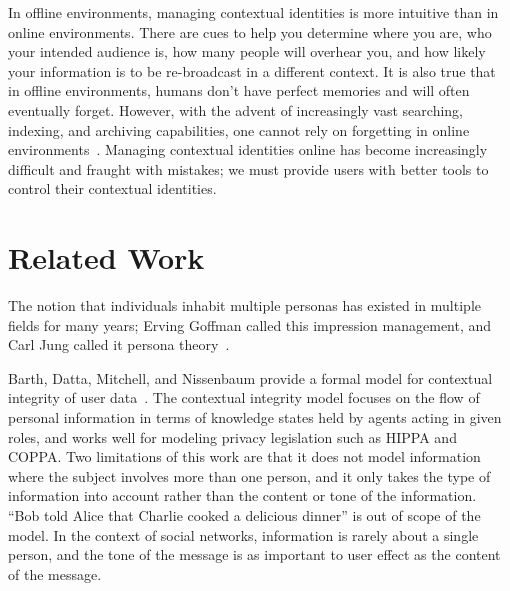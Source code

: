 \documentclass[10pt, conference, compsocconf]{IEEEtran}
\begin{document}
\begin{comment}
zuckerberg on "having multiple identities is dishonest"
http://books.google.ca/books?id=RRUkLhyGZVgC&pg=PA199&lpg=PA199&dq=%
\end{comment}

In offline environments, managing contextual identities is more intuitive than
in online environments. There are cues to help you determine where you are,
who your intended audience is, how many people will overhear you, and how
likely your information is to be re-broadcast in a different context. It is
also true that in offline environments, humans don't have perfect memories and
will often eventually forget.  However, with the advent of increasingly vast
searching, indexing, and archiving capabilities, one cannot rely on forgetting
in online environments~\cite{delete}. Managing contextual identities
online has become increasingly difficult and fraught with mistakes; we must
provide users with better tools to control their contextual identities.

\section{Related Work}

The notion that individuals inhabit multiple personas has existed in multiple
fields for many years; Erving Goffman called this impression management, and
Carl Jung called it persona theory~\cite{goffman,jung}.

Barth, Datta, Mitchell, and Nissenbaum provide a formal model for contextual
integrity of user data~\cite{barth}. The contextual integrity model focuses on
the flow of personal information in terms of knowledge states held by agents
acting in given roles, and works well for modeling privacy legislation such as
HIPPA and COPPA. Two limitations of this work are that it does not
model information where the subject involves more than one person, and it
only takes the type of information into account rather than the content or tone
of the information.  ``Bob told Alice that Charlie cooked a
delicious dinner'' is out of scope of the model.  In the context of social
networks, information is rarely about a single person, and the tone of the
message is as important to user effect as the content of the message.
\end{document}
